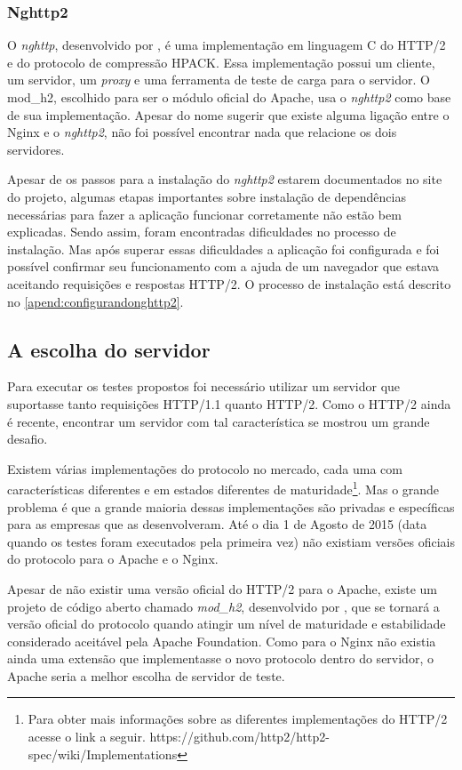 \subsubsection{Nghttp2}
\label{nghttp2}

O \textit{nghttp}, desenvolvido por , é uma implementação em linguagem C do HTTP/2 e do protocolo de compressão HPACK. Essa implementação possui um cliente, um servidor, um \textit{proxy} e uma ferramenta de teste de carga para o servidor. O mod\_h2, escolhido para ser o módulo oficial do Apache, usa o \textit{nghttp2} como base de sua implementação. Apesar do nome sugerir que existe alguma ligação entre o Nginx e o \textit{nghttp2}, não foi possível encontrar nada que relacione os dois servidores.

Apesar de os passos para a instalação do \textit{nghttp2} estarem documentados no site do projeto, algumas etapas importantes sobre instalação de dependências necessárias para fazer a aplicação funcionar corretamente não estão bem explicadas. Sendo assim, foram encontradas dificuldades no processo de instalação. Mas após superar essas dificuldades a aplicação foi configurada e foi possível confirmar seu funcionamento com a ajuda de um navegador que estava aceitando requisições e respostas HTTP/2. O processo de instalação está descrito no \autoref{apend:configurandonghttp2}.

\subsection{A escolha do servidor}
\label{aescolhadoservidor}

Para executar os testes propostos foi necessário utilizar um servidor que suportasse tanto requisições HTTP/1.1 quanto HTTP/2. Como o HTTP/2 ainda é recente, encontrar um servidor com tal característica se mostrou um grande desafio.

Existem várias implementações do protocolo no mercado, cada uma com características diferentes e em estados diferentes de maturidade\footnote{Para obter mais informações sobre as diferentes implementações do HTTP/2 acesse o link a seguir. https://github.com/http2/http2-spec/wiki/Implementations}. Mas o grande problema é que a grande maioria dessas implementações são privadas e específicas para as empresas que as desenvolveram. Até o dia 1 de Agosto de 2015 (data quando os testes foram executados pela primeira vez) não existiam versões oficiais do protocolo para o Apache e o Nginx.

Apesar de não existir uma versão oficial do HTTP/2 para o Apache, existe um projeto de código aberto chamado \textit{mod\_h2}, desenvolvido por , que se tornará a versão oficial do protocolo quando atingir um nível de maturidade e estabilidade considerado aceitável pela Apache Foundation. Como para o Nginx não existia ainda uma extensão que implementasse o novo protocolo dentro do servidor, o Apache seria a melhor escolha de servidor de teste.

